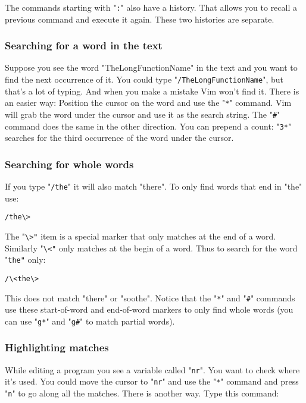 The commands starting with "\texttt{:}" also have a history.
That allows you to recall a previous command and execute it again.
These two histories are separate.

\subsubsection{Searching for a word in the text}

Suppose you see the word "TheLongFunctionName" in the text and you want to find the next occurrence of it.
You could type "\texttt{/TheLongFunctionName}", but that's a lot of typing.
And when you make a mistake Vim won't find it.
There is an easier way: Position the cursor on the word and use the "\texttt{*}" command.
Vim will grab the word under the cursor and use it as the search string.
The "\texttt{\#}" command does the same in the other direction.
You can prepend a count: "\texttt{3*}" searches for the third occurrence of the word under the cursor.

\subsubsection{Searching for whole words}

If you type "\texttt{/the}" it will also match "there".
To only find words that end in "the" use:

 \begin{Verbatim}[samepage=true]
 /the\>
 \end{Verbatim}

 The "\texttt{\textbackslash{}>"} item is a special marker that only matches at the end of a word.
 Similarly "\texttt{\textbackslash{}<"} only matches at the begin of a word.
Thus to search for the word "\texttt{the"} only:

 \begin{Verbatim}[samepage=true]
 /\<the\>
 \end{Verbatim}

This does not match "there" or "soothe".
Notice that the "\texttt{*}" and "\texttt{\#}" commands use these start-of-word and end-of-word markers to only find whole words (you can use "\texttt{g*}" and "\texttt{g\#}" to match partial words).

\subsubsection{Highlighting matches}

While editing a program you see a variable called "\texttt{nr}".
You want to check where it's used.
You could move the cursor to "\texttt{nr}" and use the "\texttt{*}" command and press "\texttt{n}" to go along all the matches.
There is another way.
Type this command:

